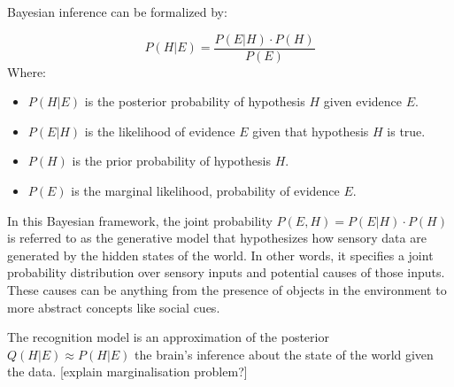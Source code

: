 Bayesian inference can be formalized by:

\[ P(H \vert E) = \frac{P(E \vert H) \cdot P(H)}{P(E)} \]
Where:
\begin{itemize}
    \item \( P(H \vert E) \) is the posterior probability of hypothesis \( H \) given evidence \( E \).
    \item \( P(E \vert H) \) is the likelihood of evidence \( E \) given that hypothesis \( H \) is true.
    \item \( P(H) \) is the prior probability of hypothesis \( H \).
    \item \( P(E) \) is the marginal likelihood, probability of evidence \( E \).
\end{itemize}

In this Bayesian framework, the joint probability \( P(E, H) = P(E \vert H) \cdot P(H) \) is referred to as the generative model that hypothesizes how sensory data are generated by the hidden states of the world. In other words, it specifies a joint probability distribution over sensory inputs and potential causes of those inputs. These causes can be anything from the presence of objects in the environment to more abstract concepts like social cues.

The recognition model is an approximation of the posterior \(Q(H \vert E) \approx P(H \vert E) \) the brain's inference about the state of the world given the data.
[explain marginalisation problem?]






















